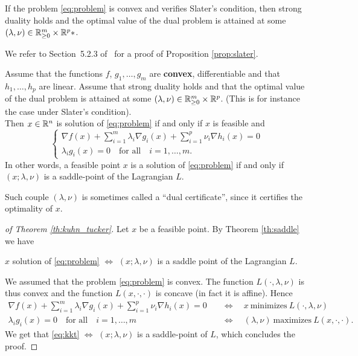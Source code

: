 \documentclass[11pt,nocut]{article}
\begin{document}
\begin{proposition}\label{prop:slater}
	If the problem \eqref{eq:problem} is convex and verifies Slater's condition, then strong duality holds and the optimal value of the dual problem is attained at some $(\lambda,\nu) \in \mathbb{R}_{\geq 0}^m \times \mathbb{R}^p*$.
\end{proposition}
We refer to Section~5.2.3 of~\cite{boyd2004convex} for a proof of Proposition \ref{prop:slater}.



\begin{theorem}\label{th:kuhn_tucker}
	Assume that the functions $f$, $g_1, \dots, g_m$ are \textbf{convex}, differentiable and that $h_1, \dots, h_p$ are linear. Assume that strong duality holds and that the optimal value of the dual problem is attained at some $(\lambda,\nu) \in \mathbb{R}_{\geq 0}^m \times \mathbb{R}^p$. (This is for instance the case under Slater's condition).
	\\

	Then $x \in \mathbb{R}^n$ is solution of \eqref{eq:problem} if and only if $x$ is feasible and
	\begin{equation}\label{eq:kkt}
		\begin{cases}
			\displaystyle \nabla f(x) + \sum_{i=1}^m \lambda_i \nabla g_i(x) + \sum_{i=1}^p \nu_i \nabla h_i(x) = 0 \\
		\lambda_i g_i(x) = 0 \quad \text{for all} \quad i=1, \dots, m.
		\end{cases}
	\end{equation}
	In other words, a feasible point $x$ is a solution of \eqref{eq:problem} if and only if $(x; \lambda, \nu)$ is a saddle-point of the Lagrangian $L$.
\end{theorem}

\noindent Such couple $(\lambda,\nu)$ is sometimes called a ``dual certificate'', since it certifies the optimality of $x$.
\\

\begin{proof}[of Theorem \ref{th:kuhn_tucker}]
	Let $x$ be a feasible point.
	By Theorem \ref{th:saddle} we have
	\begin{center}
		$x$ solution of \eqref{eq:problem} $\Longleftrightarrow$ $(x; \lambda, \nu)$ is a saddle point of the Lagrangian $L$.
	\end{center}
	
	We assumed that the problem \eqref{eq:problem} is convex. 
	The function $L(\cdot, \lambda,\nu)$ is thus convex and the function $L(x,\cdot,\cdot)$ is concave (in fact it is affine). Hence
	\begin{align*}
			\nabla f(x) + \sum_{i=1}^m \lambda_i \nabla g_i(x) + \sum_{i=1}^p \nu_i \nabla h_i(x) = 0
			\quad &\Longleftrightarrow \quad
			x \ \text{minimizes} \ L(\cdot,\lambda,\nu)
			\\
		\lambda_i g_i(x) = 0 \quad \text{for all} \quad i=1, \dots, m
		\quad &\Longleftrightarrow \quad
			(\lambda,\nu) \ \text{maximizes} \ L(x,\cdot,\cdot).
	\end{align*}
	We get that \eqref{eq:kkt} $\Longleftrightarrow$ $(x;\lambda,\nu)$ is a saddle-point of $L$, which concludes the proof.
\end{proof}
\end{document}
